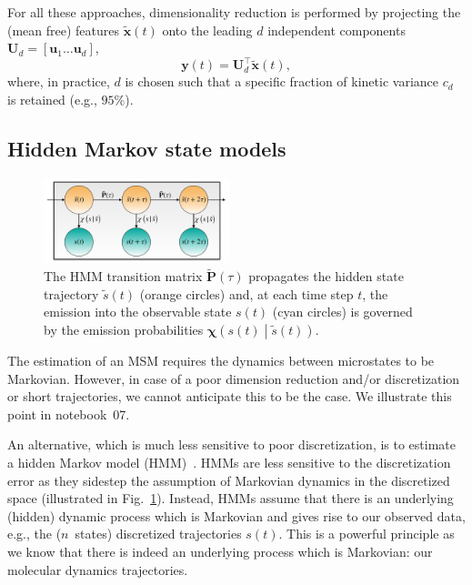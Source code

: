 \documentclass[9pt,tutorial]{livecoms}
\begin{document}
For all these approaches,
dimensionality reduction is performed by projecting the (mean free) features $\tilde{\mathbf{x}}(t)$
onto the leading $d$ independent components $\mathbf{U}_d=\left[\mathbf{u}_1 \dots \mathbf{u}_d\right]$,
\begin{equation}
\mathbf{y}(t) = \mathbf{U}_d^\top \tilde{\mathbf{x}}(t),
\end{equation}
where, in practice, $d$ is chosen such that a specific fraction of kinetic variance $c_d$ is retained (e.g., $95\%$).

\subsection{Hidden Markov state models}

\begin{figure}
\includegraphics[width=0.48\textwidth]{figure_1}
\caption{The HMM transition matrix $\tilde{\mathbf{P}}(\tau)$ propagates the hidden state trajectory $\tilde{s}(t)$ (orange circles) and, at each time step $t$, the emission into the observable state $s(t)$ (cyan circles) is governed by the emission probabilities $\bm{\chi}\left( s(t) \middle| \tilde{s}(t) \right)$.}
\label{fig:hmm-scheme}
\end{figure}

The estimation of an MSM requires the dynamics between microstates to be Markovian.
However, in case of a poor dimension reduction and/or discretization or short trajectories,
we cannot anticipate this to be the case.
We illustrate this point in notebook~07.

An alternative, which is much less sensitive to poor discretization,
is to estimate a hidden Markov model (HMM)~\cite{hmm-baum-welch-alg,jhp-spectral-rate-theory,noe-proj-hid-msm,bhmm-preprint}.
HMMs are less sensitive to the discretization error as they sidestep the assumption of Markovian dynamics in the discretized space (illustrated in Fig.~\ref{fig:hmm-scheme}).
Instead, HMMs assume that there is an underlying (hidden) dynamic process which is Markovian
and gives rise to our observed data, e.g., the ($n$~states) discretized trajectories $s(t)$.
This is a powerful principle as we know that there is indeed an underlying process which is Markovian:
our molecular dynamics trajectories.
\end{document}
